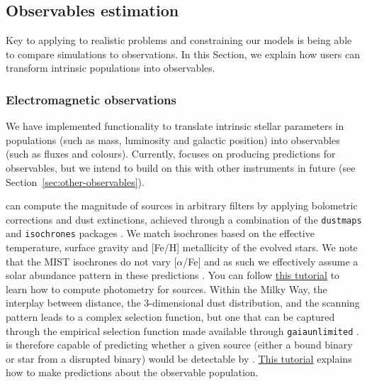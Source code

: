 \documentclass[twocolumn, twocolappendix, oneside]{aastex631}
\newcommand{\tutorialLink}[2]{\href{#1}{{\color{codecolour}#2}}}
\newcommand{\invisibleedit}[1]{#1}
\begin{document}
\subsection{Observables estimation}\label{sec:observables}

Key to applying \cogsworth{} to realistic problems and constraining our models is being able to compare simulations to observations. In this Section, we explain how users can transform intrinsic \cogsworth populations into observables.

\subsubsection{Electromagnetic observations}

We have implemented functionality to translate intrinsic stellar parameters in \cogsworth populations (such as mass, luminosity and galactic position) into observables (such as fluxes and colours). Currently, \cogsworth focuses on producing predictions for \gaia observables, but we intend to build on this with other instruments in future (see Section~\ref{sec:other-observables}). 

\cogsworth can compute the magnitude of sources in arbitrary filters by applying bolometric corrections and dust extinctions, achieved through a combination of the \texttt{dustmaps} and \texttt{isochrones} packages  \citep{2018JOSS....3..695M, Morton+2015:2015ascl.soft03010M}. \invisibleedit{We match isochrones based on the effective temperature, surface gravity and [Fe/H] metallicity of the evolved stars. We note that the MIST isochrones do not vary [$\alpha$/Fe] and as such we effectively assume a solar abundance pattern in these predictions \citep{Dotter+2016, Choi+2016:2016ApJ...823..102C}}. You can follow \tutorialLink{https://cogsworth.readthedocs.io/en/latest/tutorials/observables/photometry.html}{this tutorial} to learn how to compute photometry for \cogsworth sources. Within the Milky Way, the interplay between distance, the 3-dimensional dust distribution, and the \gaia{} scanning pattern leads to a complex selection function, but one that can be captured through the empirical selection function made available through \texttt{gaiaunlimited} \citep{Cantat-Gaudin+2023:2023A&A...669A..55C}. \cogsworth is therefore capable of predicting whether a given source (either a bound binary or star from a disrupted binary) would be detectable by \gaia. \tutorialLink{https://cogsworth.readthedocs.io/en/latest/tutorials/observables/gaia.html}{This tutorial} explains how to make predictions about the observable \gaia population.
\end{document}
